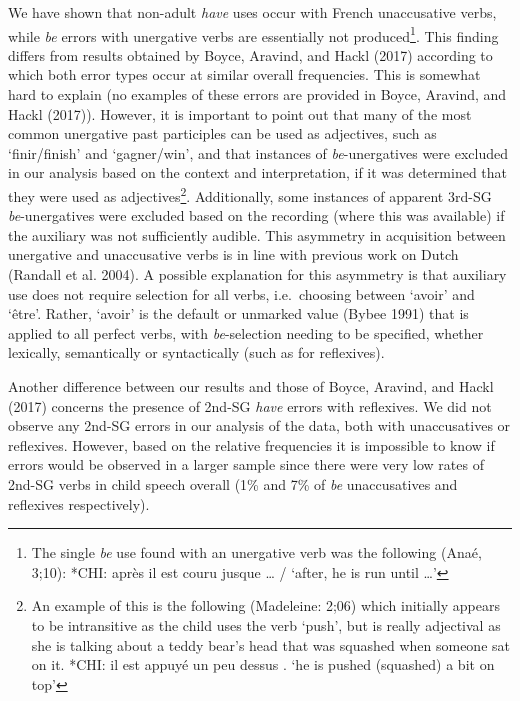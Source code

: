 \documentclass[
  12pt,
]{article}
\begin{document}
\begin{enumerate}[resume*]
\begin{enumerate}[resume*]
\begin{enumerate}[resume*]
\begin{enumerate}[resume*]
\begin{enumerate}[resume*]
We have shown that non-adult \emph{have} uses occur with French unaccusative verbs, while \emph{be} errors with unergative verbs are essentially not produced\footnote{The single \emph{be} use found with an unergative verb was the following (Anaé, 3;10): *CHI: après il est couru jusque \ldots{} /
  `after, he is run until \ldots{}'}. This finding differs from results obtained by Boyce, Aravind, and Hackl (2017) according to which both error types occur at similar overall frequencies. This is somewhat hard to explain (no examples of these errors are provided in Boyce, Aravind, and Hackl (2017)). However, it is important to point out that many of the most common unergative past participles can be used as adjectives, such as `finir/finish' and `gagner/win', and that instances of \emph{be}-unergatives were excluded in our analysis based on the context and interpretation, if it was determined that they were used as adjectives\footnote{An example of this is the following (Madeleine: 2;06) which initially appears to be intransitive as the child uses the verb `push', but is really adjectival as she is talking about a teddy bear's head that was squashed when someone sat on it.
  *CHI: il est appuyé un peu dessus .
  `he is pushed (squashed) a bit on top'}. Additionally, some instances of apparent 3rd-SG \emph{be}-unergatives were excluded based on the recording (where this was available) if the auxiliary was not sufficiently audible. This asymmetry in acquisition between unergative and unaccusative verbs is in line with previous work on Dutch (Randall et al. 2004). A possible explanation for this asymmetry is that auxiliary use does not require selection for all verbs, i.e.~choosing between `avoir' and `être'. Rather, `avoir' is the default or unmarked value (Bybee 1991) that is applied to all perfect verbs, with \emph{be}-selection needing to be specified, whether lexically, semantically or syntactically (such as for reflexives).

Another difference between our results and those of Boyce, Aravind, and Hackl (2017) concerns the presence of 2nd-SG \emph{have} errors with reflexives. We did not observe any 2nd-SG errors in our analysis of the data, both with unaccusatives or reflexives. However, based on the relative frequencies it is impossible to know if errors would be observed in a larger sample since there were very low rates of 2nd-SG verbs in child speech overall (1\% and 7\% of \emph{be} unaccusatives and reflexives respectively).


\end{enumerate}
\end{enumerate}
\end{enumerate}
\end{enumerate}
\end{enumerate}
\end{document}
